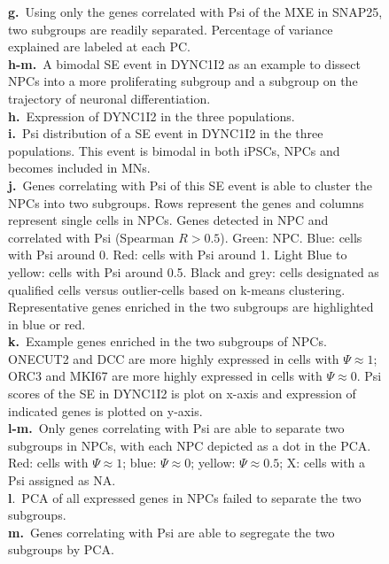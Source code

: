 \begin{figure}[h]
{\textbf{g.}~Using only the genes correlated with Psi of the MXE in SNAP25, two subgroups are readily separated. Percentage of variance explained are labeled at each PC.\\
\textbf{h-m.}~A bimodal SE event in DYNC1I2 as an example to dissect NPCs into a more proliferating subgroup and a subgroup on the trajectory of neuronal differentiation.\\
\textbf{h.}~Expression of DYNC1I2 in the three populations.\\
\textbf{i.}~Psi distribution of a SE event in DYNC1I2 in the three populations. This event is bimodal in both iPSCs, NPCs and becomes included in MNs.\\
\textbf{j.}~Genes correlating with Psi of this SE event is able to cluster the NPCs into two subgroups. Rows represent the genes and columns represent single cells in NPCs. Genes detected in NPC and correlated with Psi (Spearman $R > 0.5$). Green: NPC. Blue: cells with Psi around 0. Red: cells with Psi around 1. Light Blue to yellow: cells with Psi around 0.5. Black and grey: cells designated as qualified cells versus outlier-cells based on k-means clustering. Representative genes enriched in the two subgroups are highlighted in blue or red. \\
\textbf{k.}~Example genes enriched in the two subgroups of NPCs. ONECUT2 and DCC are more highly expressed in cells with $\Psi \approx 1$; ORC3 and MKI67 are more highly expressed in cells with $\Psi \approx 0$. Psi scores of the SE in DYNC1I2 is plot on x-axis and expression of indicated genes is plotted on y-axis.\\
\textbf{l-m.}~Only genes correlating with Psi are able to separate two subgroups in NPCs, with each NPC depicted as a dot in the PCA. Red: cells with $\Psi \approx 1$; blue: $\Psi \approx 0$; yellow: $\Psi \approx 0.5$; X: cells with a Psi assigned as NA. \\
\textbf{l}.~PCA of all expressed genes in NPCs failed to separate the two subgroups.\\
\textbf{m.}~Genes correlating with Psi are able to segregate the two subgroups by PCA.
}
  \label{fig:hidden_cell_states}
\end{figure}


